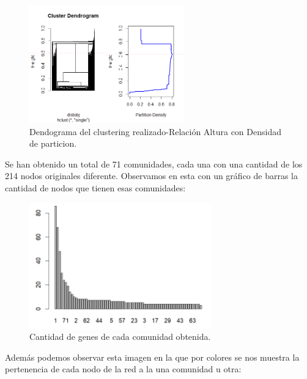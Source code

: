 \begin{figure}[h]
	\centering
	\includegraphics[width=0.60\textwidth]{figures/Grapichs_LinkComm.png}
	\caption{Dendograma del clustering realizado-Relación Altura con Densidad de particion. }
	\label{fig:LinkComm1}
\end{figure}

\newpage

\hfill

Se han obtenido un total de 71 comunidades, cada una con una cantidad de los 214 nodos originales diferente. Observamos en esta con un gráfico de barras la cantidad de nodos que tienen esas comunidades:

\begin{figure}[h]
	\centering
	\includegraphics[width=0.70\textwidth]{figures/barplot_communities.PNG}
	\caption{Cantidad de genes de cada comunidad obtenida.}
	\label{fig:LinkComm2}
\end{figure}


Además podemos observar esta imagen en la que por colores se nos muestra la pertenencia de cada nodo de la red a la una comunidad u otra:

